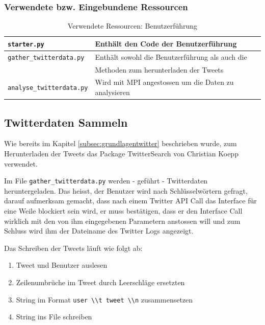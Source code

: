 \subsubsection{Verwendete bzw. Eingebundene Ressourcen}
\begin{table}[H]
\begin{center}
\begin{tabular}{|l|l|}
	\hline
	\lstinline$starter.py$ & Enthält den Code der Benutzerführung \\ \hline
	\lstinline$gather_twitterdata.py$ & Enthält sowohl die Benutzerführung als auch die \\
	& Methoden zum herunterladen der Tweets \\ \hline
	\lstinline$analyse_twitterdata.py$ & Wird mit MPI angestossen um die Daten zu analysieren \\ \hline
\end{tabular}
\caption{Verwendete Ressourcen: Benutzerführung}
\end{center}
\end{table}


\subsection{Twitterdaten Sammeln}
Wie bereits im Kapitel \ref{subsec:grundlagentwitter} beschrieben wurde, zum Herunterladen der Tweets das Package TwitterSearch von Christian Koepp\cite{twittersearch} verwendet.

Im File \lstinline$gather_twitterdata.py$ werden - geführt - Twitterdaten heruntergeladen. Das heisst, der Benutzer wird nach Schlüsselwörtern gefragt, darauf aufmerksam gemacht, dass nach einem Twitter API Call das Interface für eine Weile blockiert sein wird, er muss bestätigen, dass er den Interface Call wirklich mit den von ihm eingegebenen Parametern anstossen will und zum Schluss wird ihm der Dateiname des Twitter Logs angezeigt.

Das Schreiben der Tweets läuft wie folgt ab:
\begin{enumerate}
	\item Tweet und Benutzer auslesen
	\item Zeilenumbrüche im Tweet durch Leerschläge ersetzten
	\item String im Format \lstinline$user \\t tweet \\n$ zusammensetzen
	\item String ins File schreiben 
\end{enumerate}

